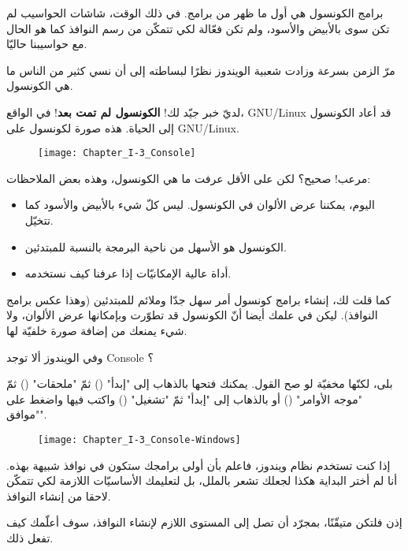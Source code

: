 برامج الكونسول هي أول ما ظهر من برامج. في ذلك الوقت، شاشات الحواسيب لم تكن سوى بالأبيض والأسود، ولم تكن فعّالة لكي تتمكّن من رسم النوافذ كما هو الحال مع حواسيبنا حاليّا.

مرّ الزمن بسرعة وزادت شعبية الويندوز نظرًا لبساطته إلى أن نسي كثير من الناس ما هي الكونسول.

لديّ خبر جيّد لك!
\textbf{الكونسول لم تمت بعد}!
 في الواقع،
\textenglish{GNU/Linux}
 قد أعاد الكونسول إلى الحياة. هذه صورة لكونسول على
\textenglish{GNU/Linux}.

\begin{figure}[H]
	\centering
	\texttt{[image: Chapter\_I-3\_Console]}
\end{figure}

مرعب! صحيح؟ لكن على الأقل عرفت ما هي الكونسول، وهذه بعض الملاحظات:

\begin{itemize}
  \item اليوم، يمكننا عرض الألوان في الكونسول. ليس كلّ شيء بالأبيض والأسود كما تتخيّل.
  \item الكونسول هو الأسهل من ناحية البرمجة بالنسبة للمبتدئين.
  \item أداة عالية الإمكانيّات إذا عرفنا كيف نستخدمه.
\end{itemize}

كما قلت لك، إنشاء برامج كونسول أمر سهل جدّا وملائم للمبتدئين (وهذا عكس برامج النوافذ). ليكن في علمك أيضا أنّ الكونسول قد تطوّرت وبإمكانها عرض الألوان، ولا شيء يمنعك من إضافة صورة خلفيّة لها.

\begin{question}
  وفي الويندوز ألا توجد
\textenglish{Console}
؟
\end{question}

بلى، لكنّها مخفيّة لو صح القول. يمكنك فتحها بالذهاب إلى "إبدأ"
()
 ثمّ "ملحقات"
()
 ثمّ "موجه الأوامر"
()
 أو بالذهاب إلى "إبدأ" ثمّ "تشغيل"
()
 واكتب فيها
 واضغط على "موافق".

\begin{figure}[H]
	\centering
	\texttt{[image: Chapter\_I-3\_Console-Windows]}
\end{figure}

إذا كنت تستخدم نظام ويندوز، فاعلم بأن أولى برامجك ستكون في نوافذ شبيهة بهذه. أنا لم أختر البداية هكذا لجعلك تشعر بالملل، بل لتعليمك الأساسيّات اللازمة لكي تتمكّن لاحقا من إنشاء النوافذ.

إذن فلتكن متيقّنًا، بمجرّد أن تصل إلى المستوى اللازم لإنشاء النوافذ، سوف أعلّمك كيف تفعل ذلك.

